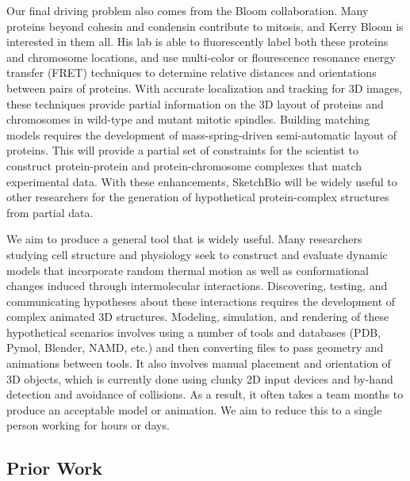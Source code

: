 \documentclass[twocolumn]{bmcart}%
\begin{document}
Our final driving problem also comes from the Bloom collaboration.
Many proteins beyond cohesin and condensin contribute to mitosis, and Kerry Bloom is interested in them all.  His lab is able to fluorescently label both these proteins and chromosome locations, and use multi-color or flourescence resonance energy transfer (FRET) techniques to determine relative distances and orientations between pairs of proteins.
With accurate localization and tracking for 3D images, these techniques provide partial information on the 3D layout of proteins and chromosomes in wild-type and mutant mitotic spindles.
Building matching models requires the development of mass-spring-driven semi-automatic layout of proteins.
This will provide a partial set of constraints for the scientist to construct protein-protein and protein-chromosome complexes that match experimental data.
With these enhancements, SketchBio will be widely useful to other researchers for the generation of hypothetical protein-complex structures from partial data.

We aim to produce a general tool that is widely useful.  Many researchers studying cell structure and physiology seek to construct
and evaluate dynamic models that incorporate random thermal motion as
well as conformational changes induced through intermolecular interactions.
Discovering, testing, and communicating hypotheses about these
interactions requires the development of complex animated 3D structures. Modeling, simulation, and rendering
of these hypothetical scenarios involves using a number of tools and databases (PDB, Pymol, Blender, NAMD, etc.)
and then converting files to pass geometry and animations between tools. It also involves
manual placement and orientation of 3D objects, which is currently done using clunky 2D input devices and by-hand
detection and avoidance of collisions. As a result, it often takes a team months to produce an acceptable
model or animation. We aim to reduce this to a single person working for hours or days.

\subsection*{Prior Work}
\end{document}
